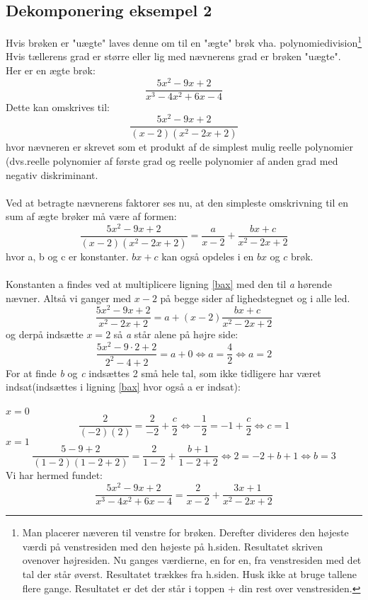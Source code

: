 \documentclass[11pt,fleqn]{book} %
\begin{document}
\subsection{Dekomponering eksempel 2}
Hvis brøken er "uægte" laves denne om til en "ægte" brøk vha. polynomiedivision\footnote{Man placerer næveren til venstre for brøken. Derefter divideres den højeste værdi på venstresiden med den højeste på h.siden. Resultatet skriven ovenover højresiden. Nu ganges værdierne, en for en, fra venstresiden med det tal der står øverst. Resultatet trækkes fra h.siden. Husk ikke at bruge tallene flere gange. Resultatet er det der står i toppen + din rest over venstresiden.} Hvis tællerens grad er større eller lig med nævnerens grad er brøken  "uægte".\\
Her er en ægte brøk:
\begin{equation}
\frac{5x^2-9x+2}{x^3-4x^2+6x-4}
\end{equation}
Dette kan omskrives til:
\begin{equation}
\frac{5x^2-9x+2}{(x-2)(x^2-2x+2)}
\end{equation}
hvor nævneren er skrevet som et produkt af de simplest mulig reelle polynomier (dvs.reelle polynomier af første grad og reelle polynomier af anden grad med negativ diskriminant.\\\\
Ved at betragte nævnerens faktorer ses nu, at den simpleste omskrivning til en sum af ægte brøker må være af formen:
\begin{equation}\label{bax}
\frac{5x^2-9x+2}{(x-2)(x^2-2x+2)}=\frac{a}{x-2}+\frac{bx+c}{x^2-2x+2}
\end{equation}
hvor a, b og c er konstanter. $bx+c$ kan også opdeles i en $bx$ og $c$ brøk.\\\\
Konstanten a findes ved at multiplicere ligning \ref{bax} med den til \textit{a} hørende nævner. Altså vi ganger med $x-2$ på begge sider af lighedstegnet og i alle led.
\begin{equation}
\frac{5x^2-9x+2}{x^2-2x+2}=a+(x-2)\frac{bx+c}{x^2-2x+2}
\end{equation}
og derpå indsætte $x=2$ så \textit{a} står alene på højre side:
\begin{equation}
\frac{5x^2-9\cdot2+2}{2^2-4+2}=a+0\Leftrightarrow a=\frac{4}{2}\Leftrightarrow a=2
\end{equation}
For at finde \textit{b} og \textit{c} indsættes 2 små hele tal, som ikke tidligere har været indsat(indsættes i ligning \ref{bax} hvor også a er indsat):\\\\
$x=0$
\begin{equation}
\frac{2}{(-2)(2)}= \frac{2}{-2}+\frac{c}{2}\Leftrightarrow -\frac{1}{2}=-1+\frac{c}{2} \Leftrightarrow c=1
\end{equation}
$x=1$ 
\begin{equation}
\frac{5-9+2}{(1-2)(1-2+2)}=\frac{2}{1-2}+\frac{b+1}{1-2+2}\Leftrightarrow 2=-2+b+1 \Leftrightarrow b=3
\end{equation}
Vi har hermed fundet:
\begin{equation}
\frac{5x^2-9x+2}{x^3-4x^2+6x-4}=\frac{2}{x-2}+\frac{3x+1}{x^2-2x+2}
\end{equation}
\end{document}
